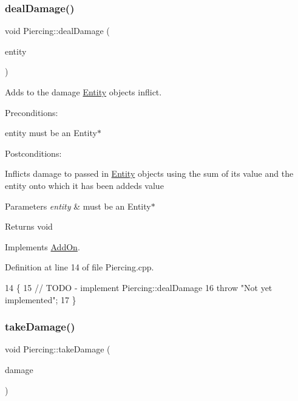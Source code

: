 \subsubsection{\texorpdfstring{deal\+Damage()}{dealDamage()}}
{\footnotesize\ttfamily void Piercing\+::deal\+Damage (\begin{DoxyParamCaption}\item[{\hyperlink{classEntity}{Entity} $\ast$}]{entity }\end{DoxyParamCaption})\hspace{0.3cm}{\ttfamily [virtual]}}



Adds to the damage \hyperlink{classEntity}{Entity} objects inflict. 

Preconditions\+:
\begin{DoxyItemize}
\item entity must be an Entity$\ast$
\end{DoxyItemize}

Postconditions\+:
\begin{DoxyItemize}
\item Inflicts damage to passed in \hyperlink{classEntity}{Entity} objects using the sum of it\textquotesingle{}s value and the entity onto which it has been added\textquotesingle{}s value
\end{DoxyItemize}


\begin{DoxyParams}{Parameters}
{\em entity} & must be an Entity$\ast$ \\
\hline
\end{DoxyParams}
\begin{DoxyReturn}{Returns}
void 
\end{DoxyReturn}


Implements \hyperlink{classAddOn}{Add\+On}.



Definition at line 14 of file Piercing.\+cpp.


\begin{DoxyCode}
14                                         \{
15     \textcolor{comment}{// TODO - implement Piercing::dealDamage}
16     \textcolor{keywordflow}{throw} \textcolor{stringliteral}{"Not yet implemented"};
17 \}
\end{DoxyCode}
\mbox{\label{classPiercing_a103634469a43e1662bd5e07e66901667}} 
\subsubsection{\texorpdfstring{take\+Damage()}{takeDamage()}}
{\footnotesize\ttfamily void Piercing\+::take\+Damage (\begin{DoxyParamCaption}\item[{int}]{damage }\end{DoxyParamCaption})\hspace{0.3cm}{\ttfamily [virtual]}}



